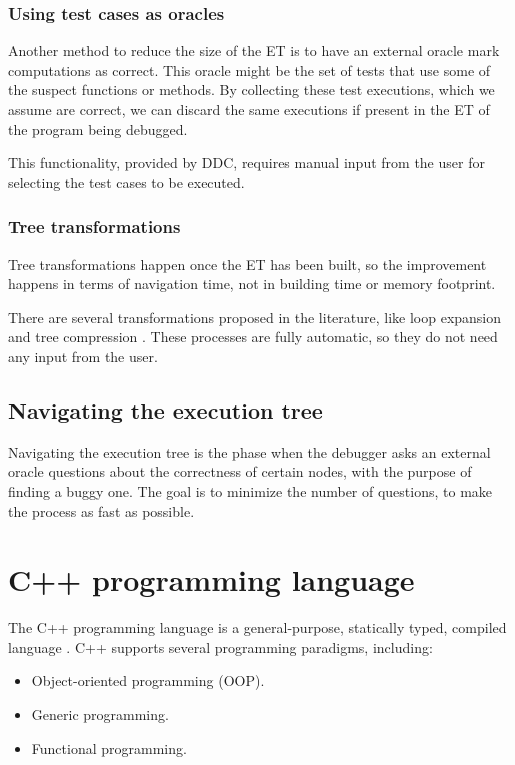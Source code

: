 \subsubsection{Using test cases as oracles}

Another method to reduce the size of the ET is to have an external oracle mark computations as correct.
This oracle might be the set of tests that use some of the suspect functions or methods. By collecting these test executions, which we assume are correct, we can discard the same executions if present in the ET of the program being debugged.

This functionality, provided by DDC, requires manual input from the user for selecting the test cases to be executed.


\subsubsection{Tree transformations}
Tree transformations happen once the ET has been built, so the improvement happens in terms of navigation time, not in building time or memory footprint.

There are several transformations proposed in the literature, like loop expansion and tree compression \cite{LoopExpansionTreeCompression}.
These processes are fully automatic, so they do not need any input from the user.

\subsection{Navigating the execution tree}
Navigating the execution tree is the phase when the debugger asks an external oracle questions about the correctness of certain nodes, with the purpose of finding a buggy one.
The goal is to minimize the number of questions, to make the process as fast as possible.
\section{C++ programming language}
The C++ programming language is a general-purpose, statically typed, compiled language \cite{cppHistory}.
%
C++ supports several programming paradigms, including:

\begin{itemize}
    \item Object-oriented programming (OOP).
    \item Generic programming.
    \item Functional programming.
\end{itemize}

